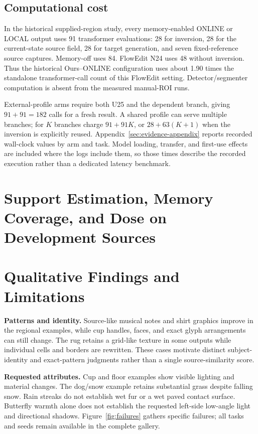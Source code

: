 \documentclass[conference]{IEEEtran}
\begin{document}
\subsection{Computational cost}
In the historical supplied-region study, every memory-enabled ONLINE or LOCAL output uses 91 transformer evaluations: 28 for inversion, 28 for the current-state source field, 28 for target generation, and seven fixed-reference source captures. Memory-off uses 84. FlowEdit N24 uses 48 without inversion. Thus the historical Ours--ONLINE configuration uses about 1.90 times the standalone transformer-call count of this FlowEdit setting. Detector/segmenter computation is absent from the measured manual-ROI runs.

External-profile arms require both U25 and the dependent branch, giving $91+91=182$ calls for a fresh result. A shared profile can serve multiple branches; for $K$ branches charge $91+91K$, or $28+63(K+1)$ when the inversion is explicitly reused. Appendix~\ref{sec:evidence-appendix} reports recorded wall-clock values by arm and task. Model loading, transfer, and first-use effects are included where the logs include them, so those times describe the recorded execution rather than a dedicated latency benchmark.

\section{Support Estimation, Memory Coverage, and Dose on Development Sources}
\label{sec:public-evaluation}








\section{Qualitative Findings and Limitations}
\label{sec:limitations}
\textbf{Patterns and identity.} Source-like musical notes and shirt graphics improve in the regional examples, while cup handles, faces, and exact glyph arrangements can still change. The rug retains a grid-like texture in some outputs while individual cells and borders are rewritten. These cases motivate distinct subject-identity and exact-pattern judgments rather than a single source-similarity score.

\textbf{Requested attributes.} Cup and floor examples show visible lighting and material changes. The dog/snow example retains substantial grass despite falling snow. Rain streaks do not establish wet fur or a wet paved contact surface. Butterfly warmth alone does not establish the requested left-side low-angle light and directional shadows. Figure~\ref{fig:failures} gathers specific failures; all tasks and seeds remain available in the complete gallery.
\end{document}
